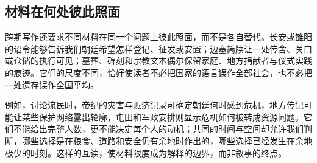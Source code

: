 \subsection{材料在何处彼此照面}

跨期写作还要求不同材料在同一个问题上彼此照面，而不是各自替代。长安或雒阳的诏令能够告诉我们朝廷希望怎样登记、征发或安置；边塞简牍让一处传舍、关口或仓储的执行可见；墓葬、碑刻和宗教文本偶尔保留家庭、地方捐献者与仪式实践的痕迹。它们的尺度不同，恰好使读者不必把国家的语言误作全部社会，也不必把一处遗存误作全国平均。

例如，讨论流民时，帝纪的灾害与赈济记录可确定朝廷何时感到危机，地方传记可能让某些保护网络露出轮廓，屯田和军政安排则显示危机如何被转成资源问题。它们不能给出完整人数，更不能决定每个人的动机；共同的时间与空间却允许我们判断，哪些选择是在粮食、道路和安全仍有余地时作出的，哪些选择已经发生在余地极少的时刻。这样的互读，使材料限度成为解释的边界，而非叙事的终点。
